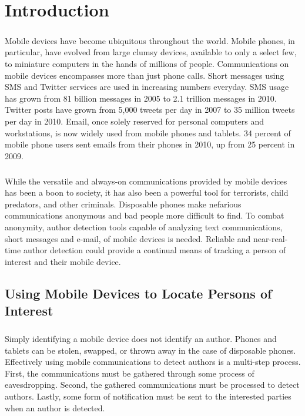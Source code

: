 \chapter{Introduction}
\paragraph*{} Mobile devices have become ubiquitous throughout the world.  Mobile phones, in particular, have evolved from large clumsy devices, available to only a select few, to miniature computers in the hands of millions of people.  Communications on mobile devices encompasses more than just phone calls.  Short messages using SMS and Twitter services are used in increasing numbers everyday.  SMS usage has grown from 81 billion messages in 2005 to 2.1 trillion messages in 2010. \cite{_u.s._????} Twitter posts have grown from 5,000 tweets per day in 2007 to 35 million tweets per day in 2010.\cite{_twitter_????} Email, once solely reserved for personal computers and workstations, is now widely used from mobile phones and tablets.  34 percent of mobile phone users sent emails from their phones in 2010, up from 25 percent in 2009. \cite{smith_mobile_2010}
\paragraph*{} While the versatile and always-on communications provided by mobile devices has been a boon to society, it has also been a powerful tool for terrorists, child predators, and other criminals.  Disposable phones make nefarious communications anonymous and bad people more difficult to find.  To combat anonymity, author detection tools capable of analyzing text communications, short messages and e-mail, of mobile devices is needed.  Reliable and near-real-time author detection could provide a continual means of tracking a person of interest and their mobile device.

\section{Using Mobile Devices to Locate Persons of Interest}
\paragraph*{} Simply identifying a mobile device does not identify an author.  Phones and tablets can be stolen, swapped, or thrown away in the case of disposable phones. Effectively using mobile communications to detect authors is a multi-step process.  First, the communications must be gathered through some process of eavesdropping. Second, the gathered communications must be processed to detect authors.  Lastly, some form of notification must be sent to the interested parties when an author is detected.
